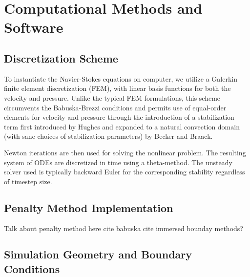 \section{Computational Methods and Software}
\label{sec:software}


\subsection{Discretization Scheme}

To instantiate the Navier-Stokes equations on computer, we utilize a
Galerkin finite element discretization (FEM), with linear basis functions for
both the velocity and pressure. Unlike the typical FEM formulations,
this scheme circumvents the Babuska-Brezzi conditions and permits use of
equal-order elements for velocity and 
pressure through the introduction of a stabilization term first
introduced by Hughes\cite{Hughes198685} and expanded to a natural
convection domain (with sane choices of stabilization parameters) by
Becker and Braack\cite{Becker2002428}. 

Newton iterations are then used for solving the nonlinear problem. 
The resulting system of ODEs are discretized in time using a theta-method. 
The unsteady solver used is typically backward Euler for the corresponding
stability regardless of timestep size. 

\subsection{Penalty Method Implementation}

Talk about penalty method here
cite babuska
cite immersed bounday methods?


\subsection{Simulation Geometry and Boundary Conditions}

